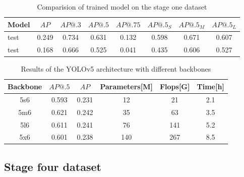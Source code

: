 \begin{table}
    \centering
    \begin{tabular}{l|c|c|c|c|c|c|c}
        Model & $AP$  & $AP@.3$ & $AP@.5$ & $AP@.75$ & $AP@.5_S$ & $AP@.5_M$ & $AP@.5_L$ \\ \hline
        test  & 0.249 & 0.734   & 0.631   & 0.132    & 0.598     & 0.671     & 0.607     \\
        test  & 0.168 & 0.666   & 0.525   & 0.041    & 0.435     & 0.606     & 0.527     \\
    \end{tabular}
    \caption{Comparision of trained model on the stage one dataset}
    \label{tab:model_results:stage_three:test}
\end{table}


\begin{table}
    \begin{tabular}{c|c|c|c|c|c}
        Backbone & $AP@.5$ & $AP$  & Parameters[M] & Flops[G] & Time[h] \\ \hline
        5s6      & 0.593   & 0.231 & 12            & 21       & 2.1     \\ \hline
        5m6      & 0.621   & 0.242 & 35            & 63       & 3.5     \\ \hline
        5l6      & 0.611   & 0.241 & 76            & 141      & 5.2     \\ \hline
        5x6      & 0.601   & 0.238 & 140           & 267      & 8.5     \\
    \end{tabular}
    \caption{Results of the YOLOv5 architecture with different backbones}
    \label{tab:yolov5_backbones}
\end{table}

\subsection{Stage four dataset}

